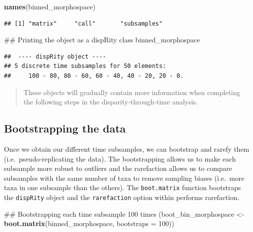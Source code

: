 \documentclass[]{book}
\newenvironment{Shaded}{\begin{snugshade}}{\end{snugshade}}
\newcommand{\KeywordTok}[1]{\textcolor[rgb]{0.13,0.29,0.53}{\textbf{#1}}}
\newcommand{\DataTypeTok}[1]{\textcolor[rgb]{0.13,0.29,0.53}{#1}}
\newcommand{\DecValTok}[1]{\textcolor[rgb]{0.00,0.00,0.81}{#1}}
\newcommand{\StringTok}[1]{\textcolor[rgb]{0.31,0.60,0.02}{#1}}
\newcommand{\NormalTok}[1]{#1}
\theoremstyle{definition}
\theoremstyle{definition}
\theoremstyle{remark}
\begin{document}
\begin{Shaded}
\begin{Highlighting}[]
\KeywordTok{names}\NormalTok{(binned_morphospace)}
\end{Highlighting}
\end{Shaded}

\begin{verbatim}
## [1] "matrix"     "call"       "subsamples"
\end{verbatim}

\begin{Shaded}
\begin{Highlighting}[]
\NormalTok{## Printing the object as a dispRity class}
\NormalTok{binned_morphospace}
\end{Highlighting}
\end{Shaded}

\begin{verbatim}
##  ---- dispRity object ---- 
## 5 discrete time subsamples for 50 elements:
##     100 - 80, 80 - 60, 60 - 40, 40 - 20, 20 - 0.
\end{verbatim}

\begin{quote}
These objects will gradually contain more information when completing
the following steps in the disparity-through-time analysis.
\end{quote}

\subsection{Bootstrapping the data}\label{bootstrapping-the-data}

Once we obtain our different time subsamples, we can bootstrap and
rarefy them (i.e.~pseudo-replicating the data). The bootstrapping allows
us to make each subsample more robust to outliers and the rarefaction
allows us to compare subsamples with the same number of taxa to remove
sampling biases (i.e.~more taxa in one subsample than the others). The
\texttt{boot.matrix} function bootstraps the \texttt{dispRity} object
and the \texttt{rarefaction} option within performs rarefaction.

\begin{Shaded}
\begin{Highlighting}[]
\NormalTok{## Bootstrapping each time subsample 100 times}
\NormalTok{(boot_bin_morphospace <-}\StringTok{ }\KeywordTok{boot.matrix}\NormalTok{(binned_morphospace, }\DataTypeTok{bootstraps =} \DecValTok{100}\NormalTok{))}
\end{Highlighting}
\end{Shaded}
\end{document}
